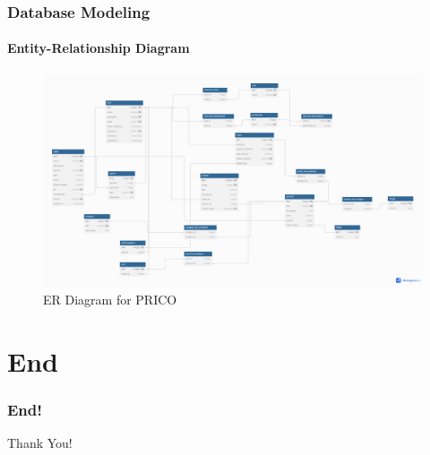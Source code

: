 \documentclass{beamer}
\begin{document}
\begin{frame}
	\frametitle{Database Modeling}
	\framesubtitle{Entity-Relationship Diagram}
	\begin{figure}
		\begin{center}
			\includegraphics[width=1\textwidth]{diagrams/er}
		\end{center}
		\caption{ER Diagram for PRICO}\label{fig:fig4}
	\end{figure}
\end{frame}

\section{End}
\begin{frame}
	\frametitle{End!}
	\Large
	\centering
	Thank You!
\end{frame}
\end{document}
